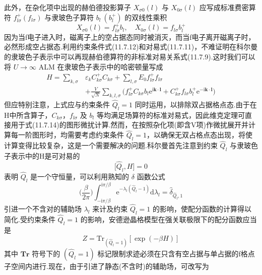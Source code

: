此外，在杂化项中出现的赫伯德投影算子 $X_{\sigma 0}(l)$ 与 $X_{0\sigma}(l)$ 应写成标准费密算符 $f_{l\sigma}^{+}(f_{l\sigma})$ 与隶玻色子算符 $b_{l}\ (b_{l}^{+})$ 的双线性乘积
\begin{equation}
  X_{\sigma 0}(l)=f_{l\sigma}^{+}b_{l},\quad X_{0\sigma}(l)=f_{l\sigma}b_{l}^{+}
\end{equation}
因为当f电子进入时，磁离子上的空占据态同时被消灭，而当f电子离开磁离子时，必然形成空占据态.利用约束条件式(11.7.12)和对易式(11.7.11)，不难证明在科尔曼的隶玻色子表示中可以再现赫伯德算符的非标准对易关系式(11.7.9).这时我们可以将 $U\to\infty$ ALM 在隶玻色子表示中的哈密顿量写成
\begin{equation}
\begin{aligned}
  H=\sum_{k,\sigma}&\varepsilon_{k}C_{k\sigma}^{+}C_{k\sigma}+\sum_{l,\sigma}E_{0}f_{l\sigma}^{+}f_{l\sigma}\\
  &+\frac{V}{\sqrt{N}}\sum_{k,l,\sigma}\bigl(f_{l\sigma}^{+}C_{k\sigma}b_{l}\mathrm{e}^{\mathrm{i}\boldsymbol{k}\cdot\boldsymbol{l}}
  +C_{k\sigma}^{+}f_{l\sigma}b_{l}^{+}\mathrm{e}^{-\mathrm{i}\boldsymbol{k}\cdot\boldsymbol{l}}\bigr)
\end{aligned}
\end{equation}
但应特别注意，上式应与约束条件 $\hat{Q}_{l}=1$ 同时运用，以排除双占据格点态.由于在H中所含算子，$C_{k\sigma}$，$f_{l\sigma}$ 及 $b_{l}$ 等均满足场算符的标准对易式，因此维克定理可直接用于式(11.7.14)的图形微扰计算.然而，在按照杂化项(即含V项)作微扰展开并计算每一阶图形时，均需要考虑约束条件 $\hat{Q}_{l}=1$，以确保无双占格点态出现，将使计算变得比较复杂，这是一个需要解决的问题.科尔曼首先注意到约束 $\hat{Q}_{l}$ 与隶玻色子表示中的H是可对易的
\begin{equation}
  \bigl[\hat{Q}_{l},H\bigr]=0
\end{equation}
表明 $\hat{Q}_{l}$ 是一个守恒量，可以利用熟知的 $\delta$ 函数公式
\begin{equation}
  \biggl(\frac{\beta}{2\pi}\biggr)\int_{-\mathrm{i}\pi/\beta}^{\mathrm{i}\pi/\beta}
  \mathrm{e}^{-\lambda_{l}(\hat{Q}_{l}-1)}\mathrm{d}\lambda_{l}
  =\hat{\delta}_{\hat{Q}_{l},1}
\end{equation}
引进一个不含对的辅助场 $\lambda_{l}$ 来计及约束 $\hat{Q}_{l}=1$ 的影响，使配分函数的计算得以简化.受约束条件 $\hat{Q}_{l}=1$ 的影响，安德逊晶格模型在强关联极限下的配分函数应当是
\begin{equation}
  Z=\mathrm{Tr}_{(\hat{Q}_{l}=1)}[\exp(-\beta H)]
\end{equation}
其中 $\mathbf{Tr}$ 符号下的 $(\hat{Q}_{l}=1)$ 标记限制求迹必须在只含有空占据与单占据的f格点子空间内进行.现在，由于引进了静态(不含时)的辅助场，可改写为
